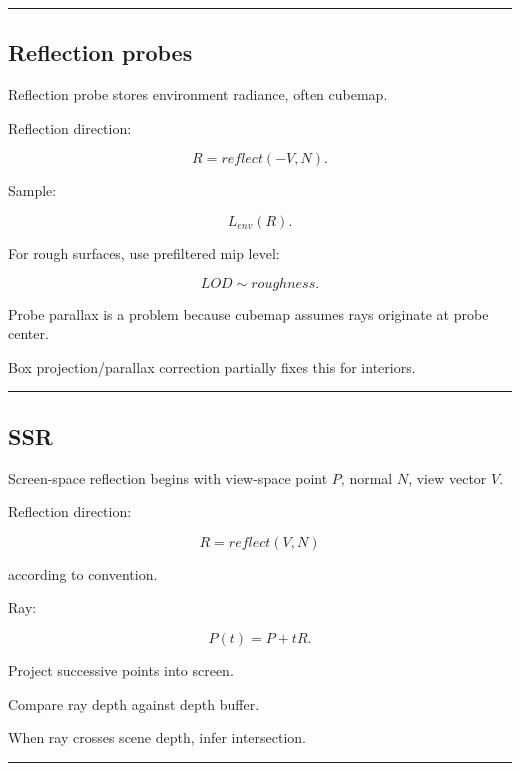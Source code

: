 \begin{center}\rule{0.5\linewidth}{0.5pt}\end{center}

\subsection{Reflection probes}\label{04-visual-computing-ii-ch040-reflection-probes}

\hypertarget{04-visual-computing-ii-ch040-reflection-probes}{}

Reflection probe stores environment radiance, often cubemap.

Reflection direction:

\[
R=
reflect(-V,N).
\]

Sample:

\[
L_{env}(R).
\]

For rough surfaces, use prefiltered mip level:

\[
LOD
\sim
roughness.
\]

Probe parallax is a problem because cubemap assumes rays originate at probe center.

Box projection/parallax correction partially fixes this for interiors.

\begin{center}\rule{0.5\linewidth}{0.5pt}\end{center}

\subsection{SSR}\label{04-visual-computing-ii-ch040-ssr}

\hypertarget{04-visual-computing-ii-ch040-ssr}{}

Screen-space reflection begins with view-space point \(P\), normal \(N\), view vector \(V\).

Reflection direction:

\[
R=
reflect(V,N)
\]

according to convention.

Ray:

\[
P(t)=P+tR.
\]

Project successive points into screen.

Compare ray depth against depth buffer.

When ray crosses scene depth, infer intersection.

\begin{center}\rule{0.5\linewidth}{0.5pt}\end{center}

